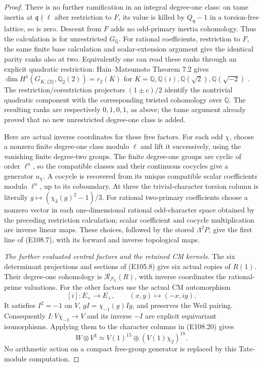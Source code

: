 \begin{proof}
There is no further ramification in an integral degree-one
class: on tame inertia at $\mathfrak q\nmid\ell$ after
restriction to $F$, its value is killed by
$Q_{\mathfrak q}-1$ in a torsion-free lattice, so is zero.
Descent from $F$ adds no odd-primary inertia cohomology.
Thus the calculation is for unrestricted $G_{\mathbb Q}$.
For rational coefficients, restriction to $F$, the same
finite base calculation and scalar-extension argument
give the identical parity ranks also at two.  Equivalently
one can read these ranks through an explicit quadratic
restriction: Hain--Matsumoto Theorem 7.2 gives
$\dim H^1(G_{K,\{2\}},\mathbb Q_2(2))=r_2(K)$ for
$K=\mathbb Q,\mathbb Q(i),\mathbb Q(\sqrt2),
\mathbb Q(\sqrt{-2})$ \cite[Theorem 7.2]{E_HainMatsumoto}.
The restriction/corestriction projectors $(1\pm c)/2$
identify the nontrivial quadratic component with the
corresponding twisted cohomology over $\mathbb Q$.
The resulting ranks are respectively $0,1,0,1$, as above;
the tame argument already proved that no new unrestricted
degree-one class is added.

Here are actual inverse coordinates for these free factors.
For each odd $\chi$, choose a nonzero finite degree-one
class modulo $\ell$ and lift it successively, using the
vanishing finite degree-two groups.  The finite degree-one
groups are cyclic of order $\ell^n$, so the compatible
classes and their continuous cocycles give a generator
$u_\chi$.  A cocycle is recovered from its unique compatible
scalar coefficients modulo $\ell^n$, up to its coboundary.
At three the trivial-character torsion column is literally
$g\mapsto(\chi_3(g)^2-1)/3$.
For rational two-primary coefficients choose a nonzero
vector in each one-dimensional rational odd-character
space obtained by the preceding restriction calculation;
scalar coefficient and cocycle multiplication are inverse
linear maps.  These choices, followed by the stored
$\Lambda^2P$, give the first line of (E108.7), with its
forward and inverse topological maps.

\emph{The further evaluated central factors and the retained CM kernels.}
The six determinant projections and sections of (E105.8)
give six actual copies of $R(1)$.  Their degree-one
cohomology is $\mathcal R_{\mathcal P_{\mathbb Q}}(R)$,
with inverse coordinates the rational-prime valuations.
For the other factors use the actual CM automorphism
\[
            [i]:E_+\longrightarrow E_+,
                         \qquad(x,y)\longmapsto(-x,iy).
 \tag{E108.22}
\]
It satisfies $I^2=-1$ on $V$,
$gI=\chi_{-1}(g)Ig$, and preserves the Weil pairing.
Consequently $I:V\chi_{-1}\to V$ and its inverse $-I$
are explicit equivariant isomorphisms.  Applying them to
the character columns in (E108.20) gives
\[
                  W\otimes V^3
                          \simeq V(1)^{15}\oplus
                                      (V(1)\chi_2)^{18}.
 \tag{E108.23}
\]
No arithmetic action on a compact free-group generator
is replaced by this Tate-module computation.


\end{proof}

